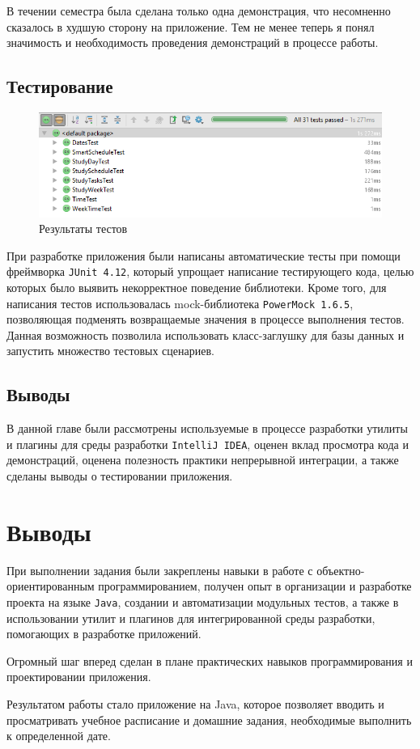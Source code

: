 В течении семестра была сделана только одна демонстрация, что несомненно сказалось в худшую сторону на приложение. Тем не менее теперь я понял значимость и необходимость проведения демонстраций в процессе работы.

\subsection{Тестирование}

\begin{figure}[H]
	\begin{center}
		\includegraphics[scale=0.7]{pics/tests}
		\caption{Результаты тестов} 
		\label{pic:tests} %
	\end{center}
\end{figure}

При разработке приложения были написаны автоматические тесты при помощи фреймворка \texttt{JUnit~4.12}, который упрощает написание тестирующего кода, целью которых было выявить некорректное поведение библиотеки. Кроме того, для написания тестов использовалась mock-библиотека \texttt{PowerMock 1.6.5}, позволяющая подменять возвращаемые значения в процессе выполнения тестов. Данная возможность позволила использовать класс-заглушку для базы данных и запустить множество тестовых сценариев.

\subsection{Выводы}

В данной главе были рассмотрены используемые в процессе разработки утилиты и плагины для среды разработки \texttt{IntelliJ IDEA}, оценен вклад просмотра кода и демонстраций, оценена полезность практики непрерывной интеграции, а также сделаны выводы о тестировании приложения.

\section{Выводы}

При выполнении задания были закреплены навыки в работе с объектно-ориентированным программированием, получен опыт в организации и разработке проекта на языке \texttt{Java}, создании и автоматизации модульных тестов, а также в использовании утилит и плагинов для интегрированной среды разработки, помогающих в разработке приложений.

Огромный шаг вперед сделан в плане практических навыков программирования и проектировании приложения.

Результатом работы стало приложение на Java, которое позволяет вводить и просматривать учебное расписание и домашние задания, необходимые выполнить к определенной дате.


